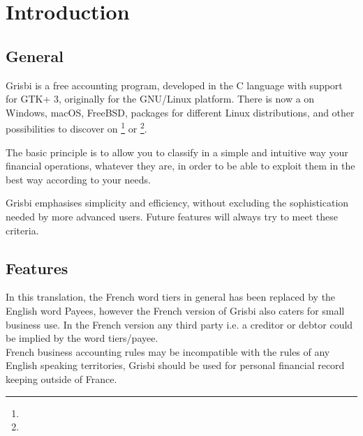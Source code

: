







\chapter{Introduction\label{introduction}}

\section{General \label{introduction-General}}

Grisbi is a free accounting program, developed in the \gls{C} language with support for \gls{GTK}+ 3, originally for the \gls{GNU/Linux} platform. There is now a  on \gls{Windows}, \gls{macOS}, FreeBSD, packages for different  \gls{Linux distributions}, and other possibilities to discover on \footnote{\urlGrisbi{}} or \footnote{\urlSourceForge{}}.

The basic principle is to allow you to classify in a simple and intuitive way your financial operations, whatever they are, in order to be able to exploit them in the best way according to your needs.

Grisbi emphasises simplicity and efficiency, without excluding the sophistication needed by more advanced users. Future features will always try to meet these criteria.

\section{Features\label{introduction-features}}

 In this translation, the French word tiers in general has been replaced by the English word Payees, however the French version of Grisbi also caters for small business use. In the French version any third party i.e. a creditor or debtor could be implied by the word tiers/payee.\\
\textcolor{red}{} French business accounting rules may be incompatible with the rules of any English speaking territories, Grisbi should be used  for personal financial record keeping outside of France.



